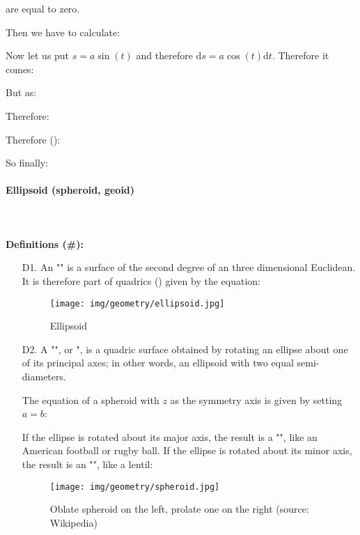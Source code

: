 {	are equal to zero.

	Then we have to calculate:
	
	Now let us put $s=a\sin(t)$ and therefore $\mathrm{d}s=a\cos(t)\mathrm{d}t$. Therefore it comes:
	
	But as:
	
	Therefore:
	
	Therefore ():
	
	So finally:
	
	
	\paragraph{Ellipsoid (spheroid, geoid)}\mbox{}\\\\
	\textbf{Definitions (\#\mydef):}
	\begin{enumerate}
		\item[D1.] An "" is a surface of the second degree of an three dimensional Euclidean. It is therefore part of quadrics () given by the equation:
		
		\begin{figure}[H]
			\centering
			\texttt{[image: img/geometry/ellipsoid.jpg]}
			\caption{Ellipsoid}
		\end{figure}

		\item[D2.] A "", or ", is a quadric surface obtained by rotating an ellipse about one of its principal axes; in other words, an ellipsoid with two equal semi-diameters.
		
	The equation of a spheroid with $z$ as the symmetry axis is given by setting $a = b$:
	

	If the ellipse is rotated about its major axis, the result is a "", like an American football or rugby ball. If the ellipse is rotated about its minor axis, the result is an "", like a lentil:
		\begin{figure}[H]
			\centering
			\texttt{[image: img/geometry/spheroid.jpg]}
			\caption{Oblate spheroid on the left, prolate one on the right (source: Wikipedia)}
		\end{figure}
	\end{enumerate}

}
